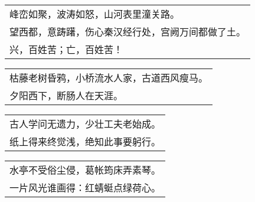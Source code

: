 \nopagebreak%
\nopagebreak%
\noindent\begin{minipage}{\linewidth}
  \vskip-3pt\begin{table}[H]
    \centering
    \begin{tabular}{@{}l@{}}
峰峦如聚，波涛如怒，山河表里潼关路。\\
望西都，意踌躇，伤心秦汉经行处，宫阙万间都做了土。\\
兴，百姓苦；亡，百姓苦！
    \end{tabular}
  \end{table}
\end{minipage}
\vspace{1cm}


\nopagebreak%
\nopagebreak%
\noindent\begin{minipage}{\linewidth}
  \vskip-3pt\begin{table}[H]
    \centering
    \begin{tabular}{@{}l@{}}
枯藤老树昏鸦，小桥流水人家，古道西风瘦马。\\
夕阳西下，断肠人在天涯。
    \end{tabular}
  \end{table}
\end{minipage}
\vspace{1cm}


\nopagebreak%
\nopagebreak%
\noindent\begin{minipage}{\linewidth}
  \vskip-3pt\begin{table}[H]
    \centering
    \begin{tabular}{@{}l@{}}
古人学问无遗力，少壮工夫老始成。\\
纸上得来终觉浅，绝知此事要躬行。
    \end{tabular}
  \end{table}
\end{minipage}
\vspace{1cm}


\nopagebreak%
\nopagebreak%
\noindent\begin{minipage}{\linewidth}
  \vskip-3pt\begin{table}[H]
    \centering
    \begin{tabular}{@{}l@{}}
水亭不受俗尘侵，葛帐筠床弄素琴。\\
一片风光谁画得：红蜻蜓点绿荷心。
    \end{tabular}
  \end{table}
\end{minipage}
\vspace{1cm}


